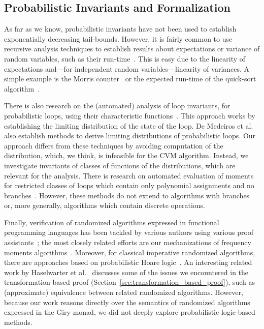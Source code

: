 \subsection{Probabilistic Invariants and Formalization}
As far as we know, probabilistic invariants have not been used to establish exponentially decreasing tail-bounds.
However, it is fairly common to use recursive analysis techniques to establish results about expectations or variance of random variables, such as their run-time~\cite[Section 1.4]{motwani1995}.
This is easy due to the linearity of expectations and---for independent random variables---linearity of variances.
A simple example is the Morris counter~\cite{morris1978} or the expected run-time of the quick-sort algorithm~\cite[Section 2.5]{mitzenmacher2005}.

There is also research on the (automated) analysis of loop invariants, for probabilistic loops, using their characteristic functions~\cite{batz2023, mciver2005}.
This approach works by establishing the limiting distribution of the state of the loop.
De Medeiros et al.~\cite[Section 3.2]{demedeiros2024} also establish methods to derive limiting distributions of probabilistic loops.
Our approach differs from these techniques by avoiding computation of the distribution, which, we think, is infeasible for the CVM algorithm.
Instead, we investigate invariants of classes of functions of the distributions, which are relevant for the analysis.
There is research on automated evaluation of moments for restricted classes of loops which contain only polynomial assignments and no branches~\cite{bartocci2019,kofnov2022}.
However, these methods do not extend to algorithms with branches or, more generally, algorithms which contain discrete operations.

Finally, verification of randomized algorithms expressed in functional programming languages has been tackled by various authors using various proof assistants~\cite{audebaud2009,bosshard2024,demedeiros2024, eberl2020,gopinathan20,hurd03, Probabilistic_Prime_Tests-AFP, tan2024, tassarotti2021}; the most closely related efforts are our mechanizations of frequency moments algorithms~\cite{karayel2022, karayel2023}.
Moreover, for classical imperative randomized algorithms, there are approaches based on probabilistic Hoare logic~\cite{denhartog2002}.
An interesting related work by Haselwarter et al.~\cite{haselwarter2025} discusses some of the issues we encountered in the transformation-based proof (Section~\ref{sec:transformation_based_proof}), such as (approximate) equivalence between related randomized algorithms.
However, because our work reasons directly over the semantics of randomized algorithms expressed in the Giry monad, we did not deeply explore probabilistic logic-based methods.
